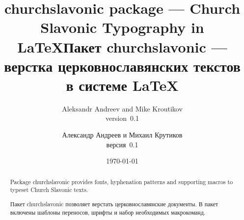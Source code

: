 \newfontfamily{}
\newfontfamily{}
\newfontfamily{}
\newfontfamily{}

\usepackage{churchslavonic}
\usepackage{hyperref}
\usepackage{xltxtra}
\usepackage{doc}
\usepackage{lettrine}

\def\pkg#1{\textsf{#1}}
\def\cs#1{\texttt{\textbackslash #1}}
%
%
\makeatletter
\def\cu@lettrine{\lettrine[lines=3,findent=0pt,nindent=0pt]}
\def\cuLettrine{\cu@tokenizeletter\cu@lettrine}
\renewcommand{\LettrineFontHook}{\cuKinovarColor}
\makeatother



\begin{EN}
\title{\pkg{churchslavonic} package --- Church Slavonic Typography in \LaTeX}
\author{Aleksandr Andreev and Mike Kroutikov\\version~0.1}
\end{EN}

\begin{RU}
\title{Пакет \pkg{churchslavonic} --- верстка церковнославянских текстов в системе \LaTeX}
\author{Александр Андреев и Михаил Крутиков\\версия~0.1}
\end{RU}

\date{\today}
\maketitle

\begin{EN}
\begin{abstract}
Package \pkg{churchslavonic} provides fonts, hyphenation patterns and supporting macros to typeset
Church Slavonic texts.
\end{abstract}
\end{EN}

\begin{RU}
\begin{abstract}
Пакет \pkg{churchslavonic} позволяет верстать церковнославянские документы. В пакет включены шаблоны переносов,
шрифты и набор необходимых макрокоманд.
\end{abstract}
\end{RU}

